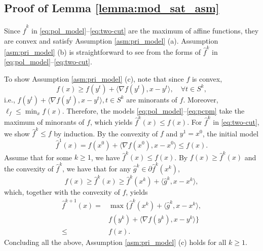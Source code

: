 \documentclass[letterpaper, 10 pt, conference]{ieeeconf}  %
\begin{document}
\begin{appendix}

\subsection{Proof of Lemma \ref{lemma:mod_sat_asm}}\label{appen:mod_sat_asm}
Since $\hat{f}^k$ in \eqref{eq:pol_model}--\eqref{eq:two-cut} are the maximum of affine functions, they are convex and satisfy Assumption \ref{asm:pri_model} (a). Assumption \ref{asm:pri_model} (b) is straightforward to see from the forms of $\hat{f}^k$ in \eqref{eq:pol_model}--\eqref{eq:two-cut}.  
    
    To show Assumption \ref{asm:pri_model} (c), note that since $f$ is convex,
    \[ f(x) \geq  f(y^t) + \langle \nabla f(y^t),x-y^t\rangle, \quad\forall  t \in S^k,\]
    i.e., $f(y^t) + \langle \nabla f(y^t),x-y^t\rangle, t \in S^k$ are minorants of $f$. Moreover, $\ell_f\le \min_x f(x)$. Therefore, the models \eqref{eq:pol_model}--\eqref{eq:pcpm} take the maximum of minorants of $f$, which yields $\hat{f}^k(x) \le f(x)$. For $\hat{f}^k$ in \eqref{eq:two-cut}, we show $\hat{f}^k \leq f$ by induction. By the convexity of $f$ and $y^1 =x^0$, the initial model \[\hat{f}^1(x) = f(x^0) + \langle \nabla f(x^0),x-x^0\rangle \leq f(x).\] Assume that for some $k \geq 1$, we have $\hat{f}^k(x) \leq f(x)$. By $f(x)\ge \hat{f}^k(x)$ and the convexity of $\hat{f}^k$, we have that for any $\hat{g}^{k}\in\partial\hat{f}^k(x^{k})$,
    \[f(x)\ge \hat{f}^k(x) \geq \hat{f}^k(x^{k}) + \langle \hat{g}^{k},x-x^{k}\rangle,\]
    which, together with the convexity of $f$, yields
    \begin{equation*}
    \begin{split}
        \hat{f}^{k+1}(x)=&\max\{\hat{f}^k(x^{k})+\langle \hat{g}^{k},x-x^k\rangle,\\ &f(y^k)+\langle \nabla f(y^k),x-y^k\rangle\} \\ \leq& 
        f(x).
    \end{split}
    \end{equation*}
    Concluding all the above, Assumption \ref{asm:pri_model} (c) holds for all $k\geq 1$.


\end{appendix}
\end{document}
